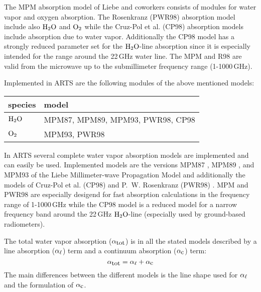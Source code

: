 


\label{levelb:CompAbsMod}
The MPM absorption model of Liebe and coworkers consists of modules for 
water vapor and oxygen absorption. The Rosenkranz (PWR98) absorption 
model include also $\mbox{H}_2\mbox{O}$ and $\mbox{O}_2$ while the Cruz-Pol et al. (CP98) absorption 
models include absorption due to water vapor. Additionally 
the CP98 model has a strongly reduced parameter set for the $\mbox{H}_2\mbox{O}$-line 
absorption since it is especially intended for the range around the 
22\,GHz water line. The MPM and R98 are valid from the microwave 
up to the submillimeter frequency range (1-1000\,GHz).

Implemented in ARTS are the following modules of the above mentioned models:
%
\begin{center}
\begin{tabular}{ll}
\hline
species & model\\
\hline
$\mbox{H}_2\mbox{O}$ & MPM87, MPM89, MPM93, PWR98, CP98 \\
$\mbox{O}_2$  & MPM93, PWR98 \\
\hline
\end{tabular}
\end{center}




\label{levelc:CompWatVapMod}
In ARTS several complete water vapor absorption models are implemented and 
can easily be used. Implemented models are the versions 
MPM87 \cite{liebeandlayton:87}, MPM89 \cite{liebe:89}, and 
MPM93 \cite{liebeetal:93} of the Liebe Millimeter-wave Propagation Model 
and additionally the models of Cruz-Pol et al. (CP98) \cite{cruzpol:98} 
and P.~W. Rosenkranz (PWR98) \cite{pwr:98}. 
MPM and PWR98 are especially desigend for fast absorption calculations in 
the frequency range of 1-1000\,GHz while the CP98 model is a reduced model 
for a narrow frequency band around the 22\,GHz $\mbox{H}_2\mbox{O}$-line (especially used 
by ground-based radiometers).

The total water vapor absorption ($\alpha_{\mbox{\rm \small tot}}$) is in all the stated models 
described by a line absorption ($\alpha_{\ell}$) term and a continuum absorption 
($\alpha_{\mbox{\small c}}$) term: 
\begin{equation}
  \label{eq:h2o:totabs}
  \alpha_{\mbox{\rm \small tot}} = \alpha_{\ell} + \alpha_{\mbox{\small c}}
\end{equation}
The main differences between the different models is the line shape used for 
$\alpha_{\ell}$ and the formulation of $\alpha_{\mbox{\small c}}$.

